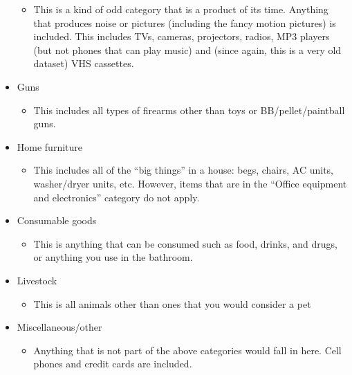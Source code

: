 \documentclass[
]{krantz}
\providecommand{\tightlist}{%
  \setlength{\itemsep}{0pt}\setlength{\parskip}{0pt}}
\begin{document}
\begin{itemize}
  \begin{itemize}
  \tightlist
  \item
    This is a kind of odd category that is a product of its
    time. Anything that produces noise or pictures
    (including the fancy motion pictures) is included. This
    includes TVs, cameras, projectors, radios, MP3 players
    (but not phones that can play music) and (since again,
    this is a very old dataset) VHS cassettes.
  \end{itemize}
\item
  Guns

  \begin{itemize}
  \tightlist
  \item
    This includes all types of firearms other than toys or
    BB/pellet/paintball guns.
  \end{itemize}
\item
  Home furniture

  \begin{itemize}
  \tightlist
  \item
    This includes all of the ``big things'' in a house:
    begs, chairs, AC units, washer/dryer units, etc.
    However, items that are in the ``Office equipment and
    electronics'' category do not apply.
  \end{itemize}
\item
  Consumable goods

  \begin{itemize}
  \tightlist
  \item
    This is anything that can be consumed such as food,
    drinks, and drugs, or anything you use in the bathroom.
  \end{itemize}
\item
  Livestock

  \begin{itemize}
  \tightlist
  \item
    This is all animals other than ones that you would
    consider a pet
  \end{itemize}
\item
  Miscellaneous/other

  \begin{itemize}
  \tightlist
  \item
    Anything that is not part of the above categories would
    fall in here. Cell phones and credit cards are included.
  \end{itemize}
\end{itemize}
\end{document}
